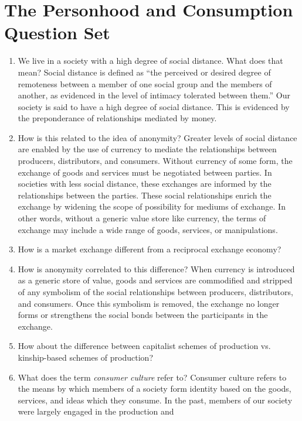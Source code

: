 \documentclass[12pt]{article}
\begin{document}
\section{The Personhood and Consumption Question Set}
\label{sec:org72e5c82}
\begin{enumerate}
\item We live in a society with a high degree of social distance. What does that mean?
\label{sec:org7126844}
Social distance is defined as ``the perceived or desired degree of remoteness
between a member of one social group and the members of another, as evidenced in
the level of intimacy tolerated between them.'' Our society is said to have a
high degree of social distance. This is evidenced by the preponderance of
relationships mediated by money.
\item How is this related to the idea of anonymity?
\label{sec:org0546c1d}
Greater levels of social distance are enabled by the use of currency to mediate
the relationships between producers, distributors, and consumers. Without
currency of some form, the exchange of goods and services must be negotiated
between parties. In societies with less social distance, these exchanges are
informed by the relationships between the parties. These social relationships
enrich the exchange by widening the scope of possibility for mediums of
exchange. In other words, without a generic value store like currency, the terms
of exchange may include a wide range of goods, services, or manipulations.
\item How is a market exchange different from a reciprocal exchange economy?
\label{sec:org7b67818}
\item How is anonymity correlated to this difference?
\label{sec:orgd07bfc7}
When currency is introduced as a generic store of value, goods and services are
commodified and stripped of any symbolism of the social relationships between
producers, distributors, and consumers. Once this symbolism is removed, the
exchange no longer forms or strengthens the social bonds between the
participants in the exchange.
\item How about the difference between capitalist schemes of production vs. kinship-based schemes of production?
\label{sec:org43e1382}
\item What does the term \emph{consumer culture} refer to?
\label{sec:org96daec4}
Consumer culture refers to the means by which members of a society form
identity based on the goods, services, and ideas which they consume. In the
past, members of our society were largely engaged in the production and

\end{enumerate}
\end{document}

